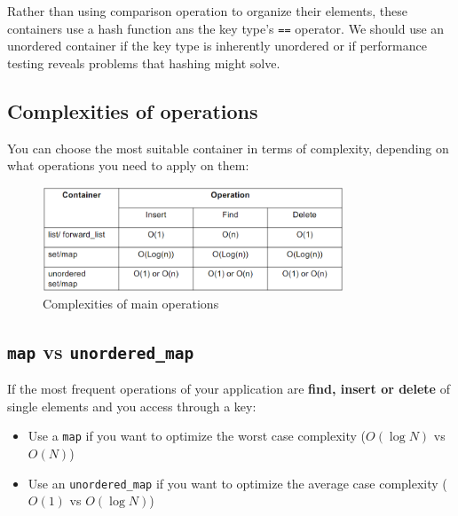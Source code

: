 Rather than using comparison operation to organize their elements, these containers
use a hash function ans the key type's \texttt{==} operator. We should use an
unordered container if the key type is inherently unordered or if performance testing
reveals problems that hashing might solve.

\subsection{Complexities of operations}

You can choose the most suitable container in terms of complexity, depending on what
operations you need to apply on them:

\begin{figure}[H]
    \centering
    \includegraphics[width=0.8\textwidth]{figures/complexities_containers.png}
    \caption{Complexities of main operations}
    \label{fig:complexities_containers}
\end{figure}

\subsection{\texttt{map} vs \texttt{unordered\_map}}

If the most frequent operations of your application are \textbf{find, insert or delete} of 
single elements and you access through a key:

\begin{itemize}
    \item Use a \texttt{map} if you want to optimize the worst case complexity ($O(\log N)$ vs 
    $O(N)$)
    \item Use an \texttt{unordered\_map} if you want to optimize the average case complexity 
    ($O(1)$ vs $O(\log N)$)
\end{itemize}

